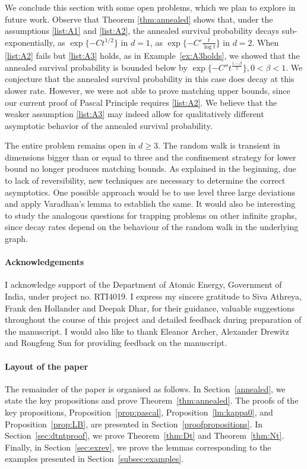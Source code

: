 \documentclass{article}[12pt]
\theoremstyle{definition}
\newcommand{\1}{\mathbbm{1}}
\begin{document}
We conclude this section with some open problems, which we plan to explore in future work. Observe that Theorem \ref{thm:annealed} shows that, under the assumptions \ref{list:A1} and \ref{list:A2}, the annealed survival probability decays sub-exponentially, as $\exp\{-C t^{1/2}\}$ in $d=1$, as $\exp\{-C' {\frac{t}{\log t}}\}$ in $d=2$. When \ref{list:A2} fails but \ref{list:A3} holds, as in Example~\ref{ex:A3holds}, we showed that the annealed survival probability is bounded below by $\exp \{-C'' t^{\frac{1-\beta}{2}}\}, 0<\beta<1$. We conjecture that the annealed survival probability in this case does decay at this slower rate. However, we were not able to prove matching upper bounds, since our current proof of Pascal Principle requires \ref{list:A2}. We believe that the weaker assumption \ref{list:A3} may indeed allow for qualitatively different asymptotic behavior of the annealed survival probability.

The entire problem remains open in $d\ge3$. The random walk is transient in dimensions bigger than or equal to three and the confinement strategy for lower bound no longer produces matching bounds. As explained in the beginning, due to lack of reversibility, new techniques are necessary to determine the correct asymptotics. One possible approach would be to use level three large deviations and apply Varadhan's lemma to establish the same. It would also be interesting to study the analogous questions for trapping problems on other infinite graphs, since decay rates depend on the behaviour of the random walk in the underlying graph. 

\paragraph{Acknowledgements}
I acknowledge support of the Department of Atomic Energy, Government of India, under project no. RTI4019.
I express my sincere gratitude to Siva Athreya, Frank den Hollander and Deepak Dhar, for their guidance, valuable suggestions throughout the course of this project  and detailed feedback during preparation of the manuscript. I would also like to thank Eleanor Archer, Alexander Drewitz and Rongfeng Sun for providing feedback on the manuscript.

\paragraph{Layout of the paper} The remainder of the paper is organised as follows. In Section~\ref{annealed}, we state the key propositions and prove Theorem~\ref{thm:annealed}. The proofs of the key propositions, Proposition~\ref{prop:pascal}, Proposition~\ref{lm:kappa0}, and Proposition~\ref{prop:LB}, are presented in Section~\ref{proofpropositions}. In Section~\ref{sec:dtntproof}, we prove Theorem~\ref{thm:Dt} and Theorem~\ref{thm:Nt}. Finally, in Section~\ref{sec:exrev}, we prove the lemmas corresponding to the examples presented in Section~\ref{subsec:examples}.
\end{document}
